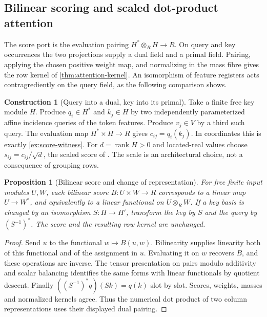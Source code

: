 \documentclass[11pt,a4paper]{article}
\newtheorem{proposition}[proposition]{Proposition}
\theoremstyle{definition}
\newtheorem{construction}[construction]{Construction}
\theoremstyle{remark}\newaliascnt{remark}{theorem}
\numberwithin{equation}{section}
\begin{document}
\subsection{Bilinear scoring and scaled dot-product attention}
The score port is the evaluation pairing \(H^*\otimes_R H\to R\). On query and key occurrences the two projections supply a dual field and a primal field. Pairing, applying the chosen positive weight map, and normalizing in the mass fibre gives the row kernel of \cref{thm:attention-kernel}. An isomorphism of feature registers acts contragrediently on the query field, as the following comparison shows.

\begin{construction}[Query into a dual, key into its primal]
Take a finite free key module \(H\). Produce \(q_i\in H^*\) and \(k_j\in H\) by two independently parameterized affine incidence queries of the token features. Produce \(v_j\in V\) by a third such query. The evaluation map \(H^*\times H\to R\) gives \(c_{ij}=q_i(k_j)\). In coordinates this is exactly \cref{ex:score-witness}. For \(d=\operatorname{rank}H>0\) and located-real values choose \(s_{ij}=c_{ij}/\sqrt d\), the scaled score of \cite{vaswani-attention}. The scale is an architectural choice, not a consequence of grouping rows.
\end{construction}
\begin{proposition}[Bilinear score and change of representation]\label{prop:pairing}
For free finite input modules \(U,W\), each bilinear score \(B:U\times W\to R\) corresponds to a linear map \(U\to W^*\), and equivalently to a linear functional on \(U\otimes_R W\). If a key basis is changed by an isomorphism \(S:H\to H'\), transform the key by \(S\) and the query by \((S^{-1})^*\). The score and the resulting row kernel are unchanged.
\end{proposition}
\begin{proof}
Send \(u\) to the functional \(w\mapsto B(u,w)\). Bilinearity supplies linearity both of this functional and of the assignment in \(u\). Evaluating it on \(w\) recovers \(B\), and these operations are inverse. The tensor presentation on pairs modulo additivity and scalar balancing identifies the same forms with linear functionals by quotient descent. Finally \(((S^{-1})^*q)(Sk)=q(k)\) slot by slot. Scores, weights, masses and normalized kernels agree. Thus the numerical dot product of two column representations uses their displayed dual pairing.
\end{proof}
\end{document}

